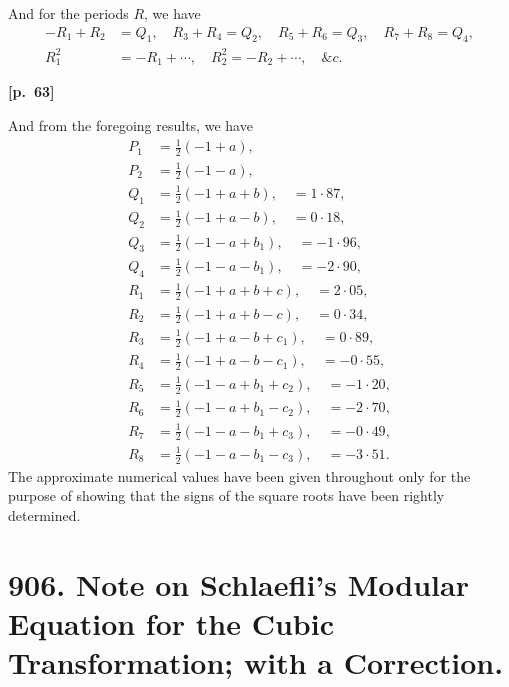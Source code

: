 \documentclass[11pt,a4paper]{book}
\begin{document}
And for the periods $R$, we have
\begin{align*}
-R_1 + R_2 &= Q_1, \quad R_3 + R_4 = Q_2, \quad R_5 + R_6 = Q_3, \quad R_7 + R_8 = Q_4, \\
R_1^2 &= -R_1 + \cdots, \quad R_2^2 = -R_2 + \cdots, \quad \&c.
\end{align*}

\vspace{0.5em}
\noindent\textbf{[p.\ 63]}

And from the foregoing results, we have
\begin{align*}
P_1 &= \tfrac{1}{2}(-1 + a), \\
P_2 &= \tfrac{1}{2}(-1 - a), \\
Q_1 &= \tfrac{1}{2}(-1 + a + b), \quad = 1\cdot 87, \\
Q_2 &= \tfrac{1}{2}(-1 + a - b), \quad = 0\cdot 18, \\
Q_3 &= \tfrac{1}{2}(-1 - a + b_1), \quad = -1\cdot 96, \\
Q_4 &= \tfrac{1}{2}(-1 - a - b_1), \quad = -2\cdot 90, \\
R_1 &= \tfrac{1}{2}(-1 + a + b + c), \quad = 2\cdot 05, \\
R_2 &= \tfrac{1}{2}(-1 + a + b - c), \quad = 0\cdot 34, \\
R_3 &= \tfrac{1}{2}(-1 + a - b + c_1), \quad = 0\cdot 89, \\
R_4 &= \tfrac{1}{2}(-1 + a - b - c_1), \quad = -0\cdot 55, \\
R_5 &= \tfrac{1}{2}(-1 - a + b_1 + c_2), \quad = -1\cdot 20, \\
R_6 &= \tfrac{1}{2}(-1 - a + b_1 - c_2), \quad = -2\cdot 70, \\
R_7 &= \tfrac{1}{2}(-1 - a - b_1 + c_3), \quad = -0\cdot 49, \\
R_8 &= \tfrac{1}{2}(-1 - a - b_1 - c_3), \quad = -3\cdot 51.
\end{align*}
The approximate numerical values have been given throughout only for the purpose of showing that the signs of the square roots have been rightly determined.

\newpage

\section*{906. Note on Schlaefli's Modular Equation for the Cubic Transformation; with a Correction.}
\end{document}
